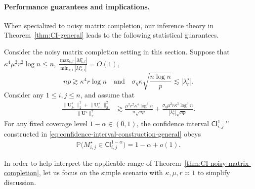 \paragraph{Performance guarantees and implications.}
When specialized to noisy matrix completion, our inference theory in Theorem~\ref{thm:CI-general} leads to the following statistical guarantees. 
%
\begin{theorem}
	\label{thm:CI-noisy-matrix-completion}
	Consider the noisy matrix completion setting in this section. 
	Suppose that $\kappa^{4}\mu^{2}r^{2}\log n\leq n$, 
	$\frac{\max_{k,l}|M_{k,l}^{\star}|}{\min_{k,l}|M_{k,l}^{\star}|}=O(1)$, 
	\begin{equation}
		np\gtrsim \kappa^{4}r\log n\quad\text{and}\quad\sigma_{\eta}\kappa\sqrt{\frac{n\log n}{p}}\lesssim|\lambda_{r}^{\star}|.  
		\label{eq:Mstar-noise-requirement-noisy-MC}
	\end{equation}
	Consider any $1\leq i,j\leq n$, and assume that
\begin{align}
	\frac{\big\|\bm{U}_{j,\cdot}^{\star}\big\|_{2}^{2}+\big\|\bm{U}_{i,\cdot}^{\star}\big\|_{2}^{2}}{\big\|\bm{U}^{\star}\big\|_{\mathrm{F}}^{2}} & \gtrsim\frac{\mu^{2}r^{2}\kappa^{4}\log^{3}n}{n\sqrt{np}}+\frac{\sigma_{\eta}\mu^{2}r\kappa^{3}\log^{3}n}{|\lambda_{r}^{\star}|\sqrt{np}}.
	\label{eq:Ui-Uj-lower-bound-thm-noisy-MC-146}
\end{align}
%
	For any fixed coverage level $1-\alpha \in (0,1)$, 
	the confidence interval $\mathsf{CI}_{i,j}^{1-\alpha}$ constructed in \eqref{eq:confidence-interval-construction-general} obeys
	\begin{align}
		\mathbb{P} \Big( M_{i,j}^{\star} \in \mathsf{CI}_{i,j}^{1-\alpha}  
		\Big) 
		= 1-\alpha + o(1).
	\end{align}
\end{theorem}
%


In order to help interpret the applicable range of Theorem~\ref{thm:CI-noisy-matrix-completion}, 
let us focus on the simple scenario with $\kappa, \mu, r\asymp 1$ to simplify discussion. 

